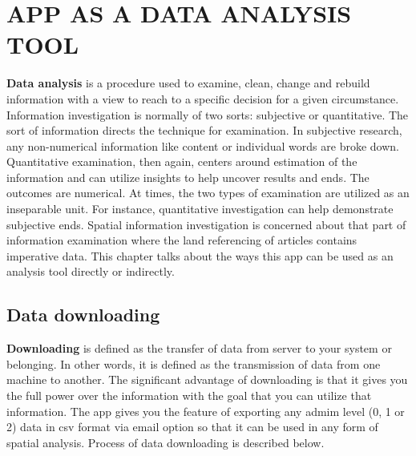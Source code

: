 \chapter{APP AS A DATA ANALYSIS TOOL}
\label{chap:analysis_tool}

\textbf{Data analysis} is a procedure used to examine, clean, change and rebuild information with a view to reach to a specific decision for a given circumstance. Information investigation is normally of two sorts: subjective or quantitative. The sort of information directs the technique for examination. In subjective research, any non-numerical information like content or individual words are broke down. Quantitative examination, then again, centers around estimation of the information and can utilize insights to help uncover results and ends. The outcomes are numerical. At times, the two types of examination are utilized as an inseparable unit. For instance, quantitative investigation can help demonstrate subjective ends. Spatial information investigation is concerned about that part of information examination where the land referencing of articles contains imperative data. This chapter talks about the ways this app can be used as an analysis tool directly or indirectly. \\

\section{Data downloading}

\textbf{Downloading} is defined as the transfer of data from server to your system or belonging. In other words, it is defined as the transmission of data from one machine to another. The significant advantage of downloading is that it gives you the full power over the information with the goal that you can utilize that information. The app gives you the feature of exporting any admim level (0, 1 or 2) data in \gls{csv} format via email option so that it can be used in any form of spatial analysis. Process of data downloading is described below.

